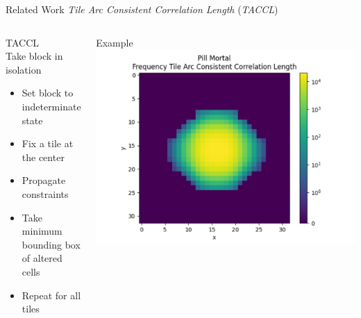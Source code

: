 \documentclass{beamer}
\begin{document}

  \begin{frame}[fragile]{Related Work}
    \textit{Tile Arc Consistent Correlation Length} (\textit{TACCL})
    \begin{columns}[T,onlytextwidth]
        \begin{block}{TACCL}
          \hfill \\
          Take block in isolation
          \begin{itemize}
            \item Set block to indeterminate state
            \item Fix a tile at the center
            \item Propagate constraints
            \item Take minimum bounding box of altered cells
            \item Repeat for all tiles
          \end{itemize}
        \end{block}
        \begin{block}{Example}
          \includegraphics[width=1.125\textwidth]{img/pm_freq_taccl.pdf}
        \end{block}
    \end{columns}
  \end{frame}




\end{document}
